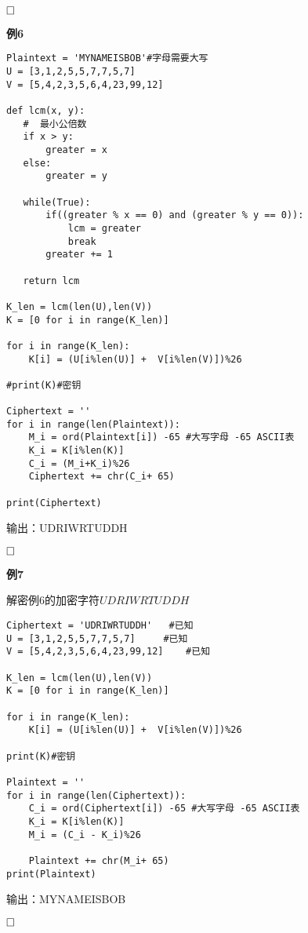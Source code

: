 \documentclass{article}
\begin{document}
$\hfill\square$ 

\clearpage

\textbf{例6}


\begin{lstlisting}
Plaintext = 'MYNAMEISBOB'#字母需要大写
U = [3,1,2,5,5,7,7,5,7]
V = [5,4,2,3,5,6,4,23,99,12]

def lcm(x, y):
   #  最小公倍数
   if x > y:
       greater = x
   else:
       greater = y
 
   while(True):
       if((greater % x == 0) and (greater % y == 0)):
           lcm = greater
           break
       greater += 1
 
   return lcm

K_len = lcm(len(U),len(V))
K = [0 for i in range(K_len)]

for i in range(K_len):
    K[i] = (U[i%len(U)] +  V[i%len(V)])%26

#print(K)#密钥

Ciphertext = ''
for i in range(len(Plaintext)):
    M_i = ord(Plaintext[i]) -65 #大写字母 -65 ASCII表
    K_i = K[i%len(K)]
    C_i = (M_i+K_i)%26
    Ciphertext += chr(C_i+ 65) 
    
print(Ciphertext)
\end{lstlisting}

输出：UDRIWRTUDDH

$\hfill\square$ 

\clearpage
\textbf{例7}

解密例6的加密字符$UDRIWRTUDDH$

\begin{lstlisting}
Ciphertext = 'UDRIWRTUDDH'   #已知
U = [3,1,2,5,5,7,7,5,7]     #已知
V = [5,4,2,3,5,6,4,23,99,12]    #已知

K_len = lcm(len(U),len(V))
K = [0 for i in range(K_len)]

for i in range(K_len):
    K[i] = (U[i%len(U)] +  V[i%len(V)])%26

print(K)#密钥

Plaintext = ''
for i in range(len(Ciphertext)):
    C_i = ord(Ciphertext[i]) -65 #大写字母 -65 ASCII表
    K_i = K[i%len(K)]
    M_i = (C_i - K_i)%26

    Plaintext += chr(M_i+ 65) 
print(Plaintext)
\end{lstlisting}

输出：MYNAMEISBOB

$\hfill\square$ 
\end{document}
